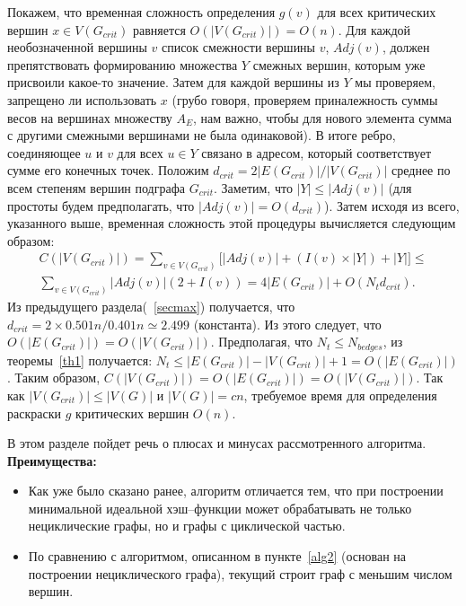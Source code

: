 \documentclass[specialist,
               substylefile = spbu.rtx,
               subf,href,colorlinks=true, 12pt]{disser}
\begin{document}
Покажем, что временная сложность определения $g(v)$ для всех критических вершин $x \in V(G_{crit})$ равняется $\mathit{O}(|V(G_{crit})|) = \mathit{O}(n)$. Для каждой необозначенной вершины $v$ список смежности вершины $v$, $Adj(v)$, должен препятствовать формированию множества $Y$ смежных вершин, которым уже присвоили какое-то значение. Затем для каждой вершины из $Y$ мы проверяем, запрещено ли использовать $x$ (грубо говоря, проверяем приналежность суммы весов на вершинах множеству $A_E$, нам важно, чтобы для нового элемента сумма с другими смежными вершинами не была одинаковой). В итоге ребро, соединяющее $u$ и $v$ для всех $u \in Y$ связано в адресом, который соответствует сумме его конечных точек. Положим $d_{crit} = 2|E(G_{crit})|/|V(G_{crit})|$ среднее по всем степеням вершин подграфа $G_{crit}$. Заметим, что $|Y| \leq |Adj(v)|$ (для простоты будем предполагать, что $|Adj(v)| = \mathit{O}(d_{crit})$). Затем исходя из всего, указанного выше, временная сложность этой процедуры вычисляется следующим образом:
\begin{equation}
\begin{split}
\mathit{C}(|V(G_{crit})|) = \sum \limits_{v \in V(G_{crit})}\Big[ |Adj(v)| + (I(v) \times |Y|) + |Y|\Big] \leq \\
\sum \limits_{v \in V(G_{crit})} |Adj(v)|(2 + I(v)) = 4|E(G_{crit})| + \mathit{O}(N_{t}d_{crit}).
\end{split}
\end{equation}
Из предыдущего раздела(~\ref{secmax}) получается, что $d_{crit} = 2 \times 0.501n/0.401n \simeq 2.499$ (константа). Из этого следует, что $\mathit{O}(|E(G_{crit})|) = \mathit{O}(|V(G_{crit})|)$. Предполагая, что $N_{t} \leq N_{bedges}$, из теоремы~\ref{th1} получается: $N_{t} \leq |E(G_{crit})| - |V(G_{crit})| + 1 = \mathit{O}(|E(G_{crit})|)$. Таким образом, $\mathit{C}(|V(G_{crit})|) = \mathit{O}(|E(G_{crit})|) = \mathit{O}(|V(G_{crit})|)$. Так как $|V(G_{crit})| \leq |V(G)|$ и $|V(G)| = cn$, требуемое время для определения раскраски $g$ критических вершин $\mathit{O}(n)$.

\newpage

\conclusion

В этом разделе пойдет речь о плюсах и минусах рассмотренного алгоритма.
\\

\textbf{Преимущества:}
\begin{itemize}
\item Как уже было сказано ранее, алгоритм отличается тем, что при построении минимальной идеальной хэш--функции может обрабатывать не только нециклические графы, но и графы с циклической частью.
\item По сравнению с алгоритмом, описанном в пункте~\ref{alg2} (основан на построении нециклического графа), текущий строит граф с меньшим числом вершин.
\end{itemize}
\end{document}
